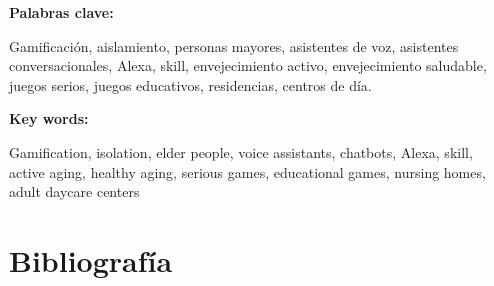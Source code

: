 \documentclass[12pt]{article}
\begin{document}
\vline

\textbf{Palabras clave:}

Gamificación, aislamiento, personas mayores, asistentes de voz, asistentes conversacionales, Alexa, skill, envejecimiento activo, envejecimiento saludable, juegos serios, juegos educativos, residencias, centros de día.

\vline

\textbf{Key words:}

Gamification, isolation, elder people, voice assistants, chatbots, Alexa, skill, active aging, healthy aging, serious games, educational games, nursing homes, adult daycare centers

\newpage
\tableofcontents

\newpage
\listoffigures

\newpage
\listoftables

\newpage



\newpage


\newpage


\newpage


\newpage


\newpage


\newpage


\newpage


\newpage


\newpage
\section{Bibliografía}
\renewcommand{\bibitemsep}{1em}
\printbibliography[heading=empty]
\end{document}
